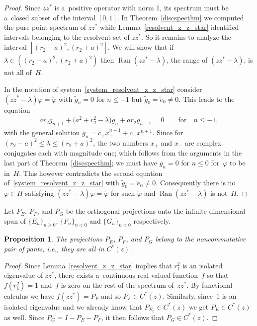 \documentclass[11pt]{article}
\numberwithin{equation}{section}
\newtheorem{Proposition}[Theorem]{Proposition}
{ \theoremstyle{definition}
\newtheorem{Definition}[Theorem]{Definition}
\newtheorem{Remark}[Theorem]{Remark} }
\begin{document}
\begin{proof}
Since $zz^*$ is a~positive operator with norm 1, its spectrum must be a~closed subset of the interval $[0,1]$.
In Theorem~\ref{discspecthm} we computed the pure point spectrum of $zz^*$ while Lemma~\ref{resolvent_z_z_star}
identif\/ied intervals belonging to the resolvent set of $zz^*$.
So it remains to analyze the interval $[(r_2-a)^2,(r_2+a)^2]$.
We will show that if $\lambda\in((r_2-a)^2,(r_2+a)^2)$ then $\operatorname{Ran}(zz^*-\lambda)$, the range of $(zz^*-\lambda)$, is not
all of~$H$.

In the notation of system~\eqref{system_resolvent_z_z_star} consider $(zz^*-\lambda)\varphi=\tilde{\varphi}$ with
$\tilde{g}_n=0$ for $n\leq -1$ but $\tilde{g}_0=\tilde{e}_0 \ne 0$.
This leads to the equation
\begin{gather*}
ar_2g_{n+1}+\big(a^2+r_2^2-\lambda\big)g_n+ar_2g_{n-1}=0 \qquad\text{for}\quad  n\leq -1,
\end{gather*}
with the general solution $g_n=c_+x_+^{n+1}+c_-x_-^{n+1}$.
Since for $(r_2-a)^2\leq\lambda\leq (r_2+a)^2$, the two numbers $x_+$ and $x_-$ are complex conjugates each with
magnitude one; which follows from the arguments in the last part of Theorem~\ref{discspecthm}; we must have $g_n =0$ for
$n\leq 0$ for~$\varphi$ to be in~$H$.
This however contradicts the second equation of~\eqref{system_resolvent_z_z_star} with $\tilde{g}_0=\tilde{e}_0 \ne 0$.
Consequently there is no $\varphi\in H$ satisfying $(zz^*-\lambda)\varphi=\tilde{\varphi}$ for such $\tilde{\varphi}$
and $\operatorname{Ran}(zz^*-\lambda)$ is not~$H$.
\end{proof}

Let $P_E$, $P_F$, and $P_G$ be the orthogonal projections onto the inf\/inite-dimensional span of $\{E_n\}_{n\geq 0}$,
$\{F_n\}_{n< 0}$ and $\{G_n\}_{n< 0}$ respectively.

\begin{Proposition}
The projections $P_E$, $P_F$, and $P_G$ belong to the noncommutative pair of pants, i.e., they are all in $C^*(z)$.
\end{Proposition}

\begin{proof}
Since Lemma~\ref{resolvent_z_z_star} implies that $r_1^2$ is an isolated eigenvalue of $zz^*$, there exists a~continuous
real valued function~$f$ so that $f(r_1^2)=1$ and~$f$ is zero on the rest of the spectrum of~$zz^*$.
By functional calculus we have $f(zz^*)=P_F$ and so $P_F\in C^*(z)$.
Similarly, since~$1$ is an isolated eigenvalue and we already know that $P_{E_0}\in C^*(z)$ we get $P_E\in C^*(z)$ as
well.
Since $P_G=I-P_E-P_F$, it then follows that $P_G\in C^*(z)$.
\end{proof}
\end{document}
